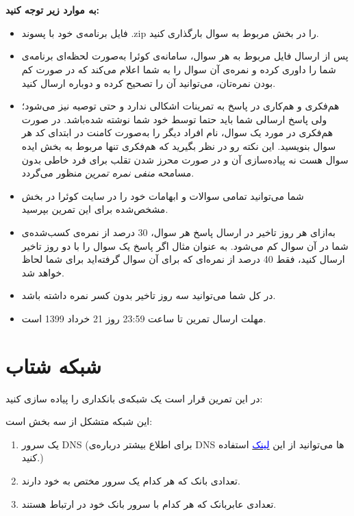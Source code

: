 \documentclass[]{article}
\begin{document}
 \Large \textbf{\\\\
به موارد زیر توجه کنید:}

\begin{itemize}[label=$\ast$]
\item  فایل برنامه‌ی خود با پسوند .zip را در بخش مربوط به سوال بارگذاری کنید.
\item پس از ارسال فایل مربوط به هر سوال، سامانه‌ی کوئرا به‌صورت لحظه‌ای برنامه‌ی شما را داوری کرده و نمره‌ی آن سوال را به شما اعلام می‌کند که در صورت کم بودن نمره‌تان، می‌توانید آن را تصحیح کرده و دوباره ارسال کنید. 
\item هم‌فکری و هم‌کاری در پاسخ به تمرینات اشکالی ندارد و حتی توصیه نیز می‌شود؛ ولی پاسخ ارسالی شما باید حتما توسط خود شما نوشته شده‌باشد. در صورت هم‌فکری در مورد یک سوال، نام افراد دیگر را به‌صورت کامنت در ابتدای کد هر سوال بنویسید.  این نکته رو در نظر بگیرید که هم‌فکری تنها مربوط به بخش ایده سوال هست نه پیاده‌سازی آن و در صورت محرز شدن تقلب برای فرد خاطی بدون مسامحه \emph{ منفی نمره تمرین}
منظور می‌گردد. 
\item شما می‌توانید تمامی سوالات و ابهامات خود را در سایت کوئرا در بخش مشخص‌شده برای این تمرین بپرسید.
\item به‌ازای هر روز تاخیر در ارسال پاسخ هر سوال، 30 درصد از نمره‌ی کسب‌شده‌ی شما در آن سوال کم می‌شود. به عنوان مثال اگر پاسخ یک سوال را با دو روز تاخیر ارسال کنید، فقط 40 درصد از نمره‌ای که برای آن سوال گرفته‌اید برای شما لحاظ خواهد شد.
\item در کل شما می‌توانید سه روز تاخیر بدون کسر نمره داشته باشد.
\item مهلت ارسال تمرین تا ساعت 23:59 روز 21 خرداد 1399 است.
\end{itemize}



\newpage

\section{شبکه شتاب}

در این تمرین قرار است یک شبکه‌ی بانکداری را پیاده سازی کنید:


این شبکه متشکل از سه بخش است:
\begin{enumerate}
\item یک سرور DNS (برای اطلاع بیشتر درباره‌ی ‌DNS ها می‌توانید از این 
\href{https://www.cloudflare.com/learning/dns/what-is-dns/}{\textcolor{blue}{لینک}}
 استفاده کنید.)
\item تعدادی بانک که هر کدام یک سرور مختص به خود دارند.
\item تعدادی عابربانک که هر کدام با سرور بانک خود در ارتباط هستند.
\end{enumerate}
\end{document}
